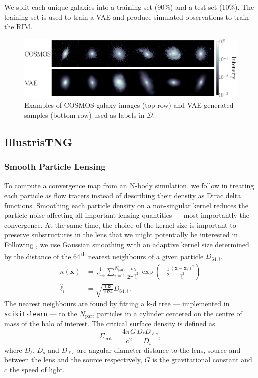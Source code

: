 We split each unique galaxies into a training set (90\%) and a test set (10\%). 
The training set is used to train a VAE and produce simulated observations 
to train the RIM.

\begin{figure}[t!]
        \centering
        \includegraphics[width=0.7\linewidth]{figures/gal_vae_sample}
        \caption{Examples of COSMOS galaxy images 
                (top row) and VAE generated samples (bottom row) used as labels in $\mathcal{D}$.}
        \label{fig:source}
\end{figure}


\subsection{IllustrisTNG}\label{sec:kappa}
\subsubsection{Smooth Particle Lensing}\label{sec:SPL}
To compute a convergence map from an N-body simulation, 
we follow \citet{Auger2007} in treating 
each particle as flow tracers instead of describing their density as Dirac delta functions. 
Smoothing each particle density on a non-singular kernel reduces the particle noise affecting all 
important lensing quantities --- most importantly the convergence. At the same time, the choice of the kernel size 
is important to preserve substructures in the 
lens that we might potentially be interested in. Following \citet{Rau2013}, we use Gaussian 
smoothing with an adaptive kernel size determined by the distance of the 64\textsuperscript{th} nearest neighbours of 
a given particle $D_{64,i}$. 
\begin{equation}\label{eq:Ksmooth}
\begin{aligned}
    \kappa(\mathbf{x}) &= \frac{1}{\Sigma_{\mathrm{crit}}} \sum_{i=1}^{N_{\mathrm{part}}}
        \frac{m_i}{2 \pi \hat{\ell}^2_i} 
        \exp \left(-\frac{1}{2} \frac{(\mathbf{x} - \mathbf{x}_i)^2}{\hat{\ell}_i^2}  \right) \\
    \hat{\ell}_i &= \sqrt{\frac{103}{1024}}D_{64,i}.
\end{aligned}
\end{equation}
The nearest neighbours are found by fitting a k-d tree ---  implemented in 
\texttt{scikit-learn} \citep{scikit-learn} --- 
to the $N_{\mathrm{part}}$  particles 
in a cylinder centered on the centre of mass of the halo of interest.
The critical surface density is defined as
\begin{equation}\label{eq:Scrit}
\Sigma_{\mathrm{crit}} = \frac{4 \pi G}{c^ 2} \frac{D_\ell D_{\ell s}}{D_s},
\end{equation}
where $D_\ell$, $D_s$ and $D_{\ell s}$ are angular diameter distance to the lens, source and between the lens and the source respectively, 
$G$ is the gravitational constant and $c$ the speed of light.

